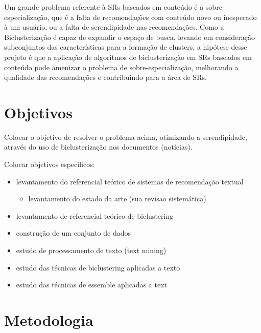 \documentclass[normaltoc, espacoumemeio, pnumromarab,ruledheader]{abnt}
\begin{document}

Um grande problema referente à SRs baseados em conteúdo é a sobre-especialização, que é a falta de recomendações com conteúdo novo ou inesperado à um usuário, ou a falta de serendipidade nas recomendações. Como a Biclusterização é capaz de expandir o espaço de busca, levando em consideração subconjuntos das características para a formação de clusters, a hipótese desse projeto é que a aplicação de algoritmos de biclusterização em SRs baseados em conteúdo pode amenizar o problema de sobre-especialização, melhorando a qualidade das recomendações e contribuindo para a área de SRs.


\section{Objetivos}

Colocar o objetivo de resolver o problema acima, otimizando a serendipidade, através do uso de biclusterização nos documentos (notícias).

Colocar objetivos especificos:
\begin{itemize}
 \item levantamento do referencial teórico de sistemas de recomendação textual
		\begin{itemize}
		   \item levantamento do estado da arte (sua revisao sistemática)
			\end{itemize}
 \item levantamento de referencial teórico de biclustering
 \item construção de um conjunto de dados
 \item estudo de processamento de texto (text mining)
 \item estudo das técnicas de biclustering aplicadas a texto
 \item estudo das técnicas de essemble aplicadas a text
\end{itemize}

\section{Metodologia}
\end{document}
